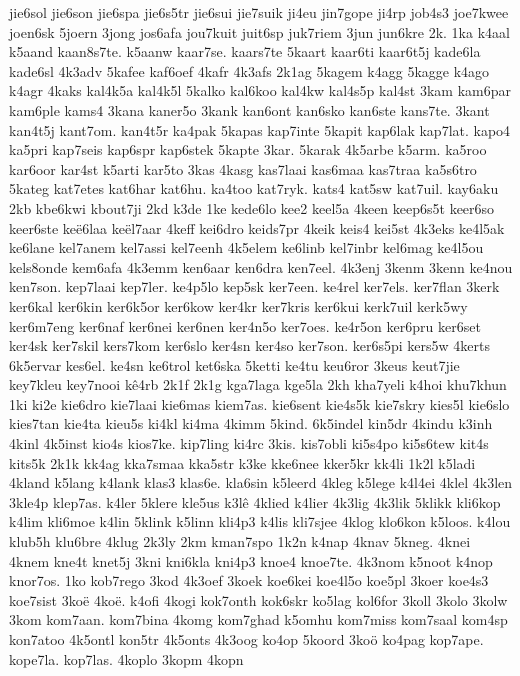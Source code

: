 jie6sol
jie6son
jie6spa
jie6s5tr
jie6sui
jie7suik
ji4eu
jin7gope
ji4rp
job4s3
joe7kwee
joen6sk
5joern
3jong
jos6afa
jou7kuit
juit6sp
juk7riem
3jun
jun6kre
2k.
1ka
k4aal
k5aand
kaan8s7te.
k5aanw
kaar7se.
kaars7te
5kaart
kaar6ti
kaar6t5j
kade6la
kade6sl
4k3adv
5kafee
kaf6oef
4kafr
4k3afs
2k1ag
5kagem
k4agg
5kagge
k4ago
k4agr
4kaks
kal4k5a
kal4k5l
5kalko
kal6koo
kal4kw
kal4s5p
kal4st
3kam
kam6par
kam6ple
kams4
3kana
kaner5o
3kank
kan6ont
kan6sko
kan6ste
kans7te.
3kant
kan4t5j
kant7om.
kan4t5r
ka4pak
5kapas
kap7inte
5kapit
kap6lak
kap7lat.
kapo4
ka5pri
kap7seis
kap6spr
kap6stek
5kapte
3kar.
5karak
4k5arbe
k5arm.
ka5roo
kar6oor
kar4st
k5arti
kar5to
3kas
4kasg
kas7laai
kas6maa
kas7traa
ka5s6tro
5kateg
kat7etes
kat6har
kat6hu.
ka4too
kat7ryk.
kats4
kat5sw
kat7uil.
kay6aku
2kb
kbe6kwi
kbout7ji
2kd
k3de
1ke
kede6lo
kee2
keel5a
4keen
keep6s5t
keer6so
keer6ste
keë6laa
keël7aar
4keff
kei6dro
keids7pr
4keik
keis4
kei5st
4k3eks
ke4l5ak
ke6lane
kel7anem
kel7assi
kel7eenh
4k5elem
ke6linb
kel7inbr
kel6mag
ke4l5ou
kels8onde
kem6afa
4k3emm
ken6aar
ken6dra
ken7eel.
4k3enj
3kenm
3kenn
ke4nou
ken7son.
kep7laai
kep7ler.
ke4p5lo
kep5sk
ker7een.
ke4rel
ker7els.
ker7flan
3kerk
ker6kal
ker6kin
ker6k5or
ker6kow
ker4kr
ker7kris
ker6kui
kerk7uil
kerk5wy
ker6m7eng
ker6naf
ker6nei
ker6nen
ker4n5o
ker7oes.
ke4r5on
ker6pru
ker6set
ker4sk
ker7skil
kers7kom
ker6slo
ker4sn
ker4so
ker7son.
ker6s5pi
kers5w
4kerts
6k5ervar
kes6el.
ke4sn
ke6trol
ket6ska
5ketti
ke4tu
keu6ror
3keus
keut7jie
key7kleu
key7nooi
kê4rb
2k1f
2k1g
kga7laga
kge5la
2kh
kha7yeli
k4hoi
khu7khun
1ki
ki2e
kie6dro
kie7laai
kie6mas
kiem7as.
kie6sent
kie4s5k
kie7skry
kies5l
kie6slo
kies7tan
kie4ta
kieu5s
ki4kl
ki4ma
4kimm
5kind.
6k5indel
kin5dr
4kindu
k3inh
4kinl
4k5inst
kio4s
kios7ke.
kip7ling
ki4rc
3kis.
kis7obli
ki5s4po
ki5s6tew
kit4s
kits5k
2k1k
kk4ag
kka7smaa
kka5str
k3ke
kke6nee
kker5kr
kk4li
1k2l
k5ladi
4kland
k5lang
k4lank
klas3
klas6e.
kla6sin
k5leerd
4kleg
k5lege
k4l4ei
4klel
4k3len
3kle4p
klep7as.
k4ler
5klere
kle5us
k3lê
4klied
k4lier
4k3lig
4k3lik
5klikk
kli6kop
k4lim
kli6moe
k4lin
5klink
k5linn
kli4p3
k4lis
kli7sjee
4klog
klo6kon
k5loos.
k4lou
klub5h
klu6bre
4klug
2k3ly
2km
kman7spo
1k2n
k4nap
4knav
5kneg.
4knei
4knem
kne4t
knet5j
3kni
kni6kla
kni4p3
knoe4
knoe7te.
4k3nom
k5noot
k4nop
knor7os.
1ko
kob7rego
3kod
4k3oef
3koek
koe6kei
koe4l5o
koe5pl
3koer
koe4s3
koe7sist
3koë
4koë.
k4ofi
4kogi
kok7onth
kok6skr
ko5lag
kol6for
3koll
3kolo
3kolw
3kom
kom7aan.
kom7bina
4komg
kom7ghad
k5omhu
kom7miss
kom7saal
kom4sp
kon7atoo
4k5ontl
kon5tr
4k5onts
4k3oog
ko4op
5koord
3koö
ko4pag
kop7ape.
kope7la.
kop7las.
4koplo
3kopm
4kopn
